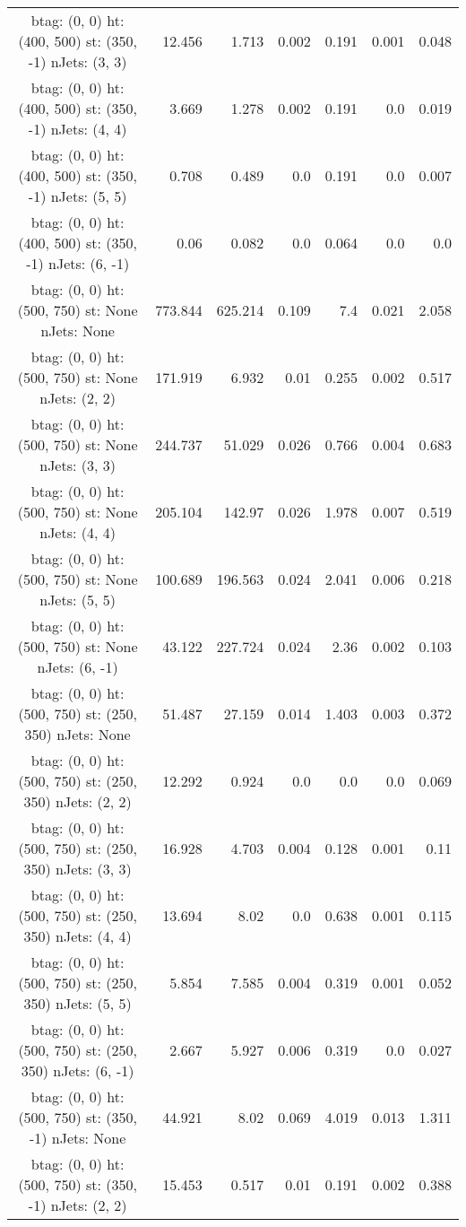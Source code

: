 \documentclass[12pt]{paper}
\begin{document}
\begin{landscape}
\begin{longtable}{c|r|r|r|r|r|r}
btag:  (0, 0) ht:  (400, 500) st:  (350, -1) nJets:  (3, 3)
 & 12.456 & 1.713 & 0.002 & 0.191 & 0.001 & 0.048\\
btag:  (0, 0) ht:  (400, 500) st:  (350, -1) nJets:  (4, 4)
 & 3.669 & 1.278 & 0.002 & 0.191 & 0.0 & 0.019\\
btag:  (0, 0) ht:  (400, 500) st:  (350, -1) nJets:  (5, 5)
 & 0.708 & 0.489 & 0.0 & 0.191 & 0.0 & 0.007\\
btag:  (0, 0) ht:  (400, 500) st:  (350, -1) nJets:  (6, -1)
 & 0.06 & 0.082 & 0.0 & 0.064 & 0.0 & 0.0\\
btag:  (0, 0) ht:  (500, 750) st:  None nJets:  None
 & 773.844 & 625.214 & 0.109 & 7.4 & 0.021 & 2.058\\
btag:  (0, 0) ht:  (500, 750) st:  None nJets:  (2, 2)
 & 171.919 & 6.932 & 0.01 & 0.255 & 0.002 & 0.517\\
btag:  (0, 0) ht:  (500, 750) st:  None nJets:  (3, 3)
 & 244.737 & 51.029 & 0.026 & 0.766 & 0.004 & 0.683\\
btag:  (0, 0) ht:  (500, 750) st:  None nJets:  (4, 4)
 & 205.104 & 142.97 & 0.026 & 1.978 & 0.007 & 0.519\\
btag:  (0, 0) ht:  (500, 750) st:  None nJets:  (5, 5)
 & 100.689 & 196.563 & 0.024 & 2.041 & 0.006 & 0.218\\
btag:  (0, 0) ht:  (500, 750) st:  None nJets:  (6, -1)
 & 43.122 & 227.724 & 0.024 & 2.36 & 0.002 & 0.103\\
btag:  (0, 0) ht:  (500, 750) st:  (250, 350) nJets:  None
 & 51.487 & 27.159 & 0.014 & 1.403 & 0.003 & 0.372\\
btag:  (0, 0) ht:  (500, 750) st:  (250, 350) nJets:  (2, 2)
 & 12.292 & 0.924 & 0.0 & 0.0 & 0.0 & 0.069\\
btag:  (0, 0) ht:  (500, 750) st:  (250, 350) nJets:  (3, 3)
 & 16.928 & 4.703 & 0.004 & 0.128 & 0.001 & 0.11\\
btag:  (0, 0) ht:  (500, 750) st:  (250, 350) nJets:  (4, 4)
 & 13.694 & 8.02 & 0.0 & 0.638 & 0.001 & 0.115\\
btag:  (0, 0) ht:  (500, 750) st:  (250, 350) nJets:  (5, 5)
 & 5.854 & 7.585 & 0.004 & 0.319 & 0.001 & 0.052\\
btag:  (0, 0) ht:  (500, 750) st:  (250, 350) nJets:  (6, -1)
 & 2.667 & 5.927 & 0.006 & 0.319 & 0.0 & 0.027\\
btag:  (0, 0) ht:  (500, 750) st:  (350, -1) nJets:  None
 & 44.921 & 8.02 & 0.069 & 4.019 & 0.013 & 1.311\\
btag:  (0, 0) ht:  (500, 750) st:  (350, -1) nJets:  (2, 2)
 & 15.453 & 0.517 & 0.01 & 0.191 & 0.002 & 0.388\\

\end{longtable}
\end{landscape}
\end{document}
